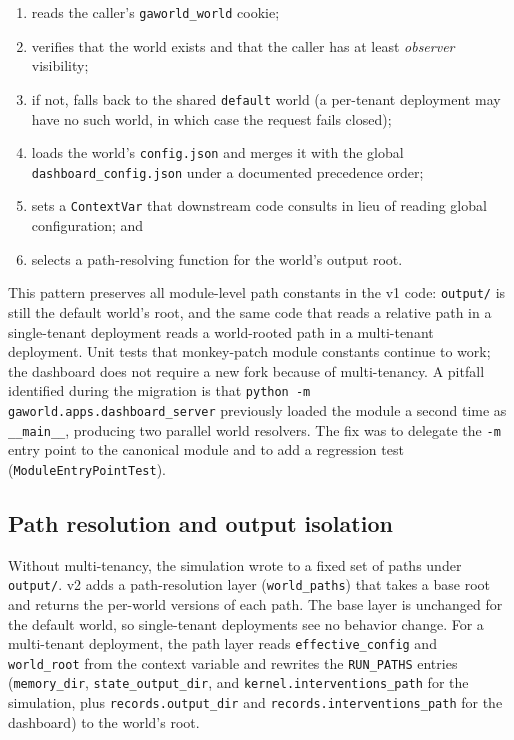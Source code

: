 \begin{enumerate}[leftmargin=*,label=\arabic*.]
  \item reads the caller's \texttt{gaworld\_world} cookie;
  \item verifies that the world exists and that the caller has at least
  \emph{observer} visibility;
  \item if not, falls back to the shared \texttt{default} world (a
  per-tenant deployment may have no such world, in which case the request
  fails closed);
  \item loads the world's \texttt{config.json} and merges it with the global
  \texttt{dashboard\_config.json} under a documented precedence order;
  \item sets a \texttt{ContextVar} that downstream code consults in lieu of
  reading global configuration; and
  \item selects a path-resolving function for the world's output root.
\end{enumerate}

This pattern preserves all module-level path constants in the v1 code:
\texttt{output/} is still the default world's root, and the same code that
reads a relative path in a single-tenant deployment reads a world-rooted
path in a multi-tenant deployment.  Unit tests that monkey-patch module
constants continue to work; the dashboard does not require a new fork
because of multi-tenancy.  A pitfall identified during the migration is
that \texttt{python -m gaworld.apps.dashboard\_server} previously loaded
the module a second time as \texttt{\_\_main\_\_}, producing two parallel
world resolvers.  The fix was to delegate the \texttt{-m} entry point to
the canonical module and to add a regression test
(\texttt{ModuleEntryPointTest}).

\subsection{Path resolution and output isolation}

Without multi-tenancy, the simulation wrote to a fixed set of paths under
\texttt{output/}.  v2 adds a path-resolution layer (\texttt{world\_paths})
that takes a base root and returns the per-world versions of each path.
The base layer is unchanged for the default world, so single-tenant
deployments see no behavior change.  For a multi-tenant deployment, the
path layer reads \texttt{effective\_config} and \texttt{world\_root} from
the context variable and rewrites the \texttt{RUN\_PATHS} entries
(\texttt{memory\_dir}, \texttt{state\_output\_dir}, and
\texttt{kernel.interventions\_path} for the simulation, plus
\texttt{records.output\_dir} and \texttt{records.interventions\_path} for
the dashboard) to the world's root.

